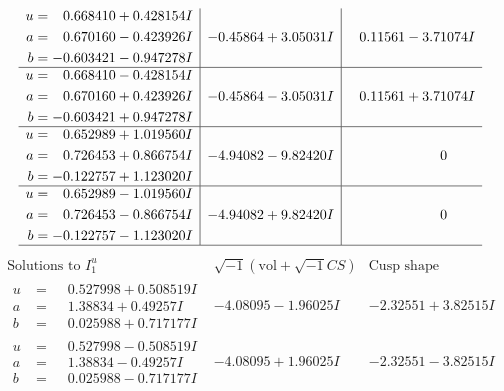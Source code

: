 \documentclass[1p]{elsarticle_modified}
\theoremstyle{definition}
\newcommand{\I}{\sqrt{-1}}
\begin{document}
$$\begin{array}{c|c|c}
\begin{aligned}
u &= \phantom{-}0.668410 + 0.428154 I \\
a &= \phantom{-}0.670160 - 0.423926 I \\
b &= -0.603421 - 0.947278 I\end{aligned}
 & -0.45864 + 3.05031 I & \phantom{-}0.11561 - 3.71074 I \\ \hline\begin{aligned}
u &= \phantom{-}0.668410 - 0.428154 I \\
a &= \phantom{-}0.670160 + 0.423926 I \\
b &= -0.603421 + 0.947278 I\end{aligned}
 & -0.45864 - 3.05031 I & \phantom{-}0.11561 + 3.71074 I \\ \hline\begin{aligned}
u &= \phantom{-}0.652989 + 1.019560 I \\
a &= \phantom{-}0.726453 + 0.866754 I \\
b &= -0.122757 + 1.123020 I\end{aligned}
 & -4.94082 - 9.82420 I & \phantom{-0.000000 } 0 \\ \hline\begin{aligned}
u &= \phantom{-}0.652989 - 1.019560 I \\
a &= \phantom{-}0.726453 - 0.866754 I \\
b &= -0.122757 - 1.123020 I\end{aligned}
 & -4.94082 + 9.82420 I & \phantom{-0.000000 } 0\\
 \hline 
 \end{array}$$\newpage$$\begin{array}{c|c|c}  
\text{Solutions to }I^u_{1}& \I (\text{vol} + \sqrt{-1}CS) & \text{Cusp shape}\\
 \hline 
\begin{aligned}
u &= \phantom{-}0.527998 + 0.508519 I \\
a &= \phantom{-}1.38834 + 0.49257 I \\
b &= \phantom{-}0.025988 + 0.717177 I\end{aligned}
 & -4.08095 - 1.96025 I & -2.32551 + 3.82515 I \\ \hline\begin{aligned}
u &= \phantom{-}0.527998 - 0.508519 I \\
a &= \phantom{-}1.38834 - 0.49257 I \\
b &= \phantom{-}0.025988 - 0.717177 I\end{aligned}
 & -4.08095 + 1.96025 I & -2.32551 - 3.82515 I \\ \hline\begin{aligned}

\end{aligned}
\end{array}$$
\end{document}
